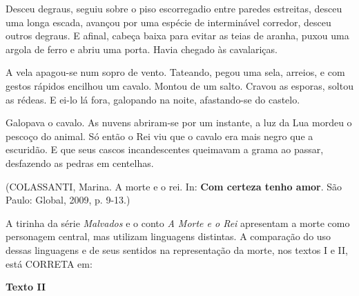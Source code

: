 Desceu degraus, seguiu sobre o piso escorregadio entre paredes estreitas, desceu uma longa escada, avançou por uma espécie de interminável corredor, desceu outros degraus. E afinal, cabeça baixa para evitar as teias de aranha, puxou uma argola de ferro e abriu uma porta. Havia chegado às cavalariças.

A vela apagou-se num sopro de vento. Tateando, pegou uma sela, arreios, e com gestos rápidos encilhou um cavalo. Montou de um salto. Cravou as esporas, soltou as rédeas. E ei-lo lá fora, galopando na noite, afastando-se do castelo.

Galopava o cavalo. As nuvens abriram-se por um instante, a luz da Lua mordeu o pescoço do animal. Só então o Rei viu que o cavalo era mais negro que a escuridão. E que seus cascos incandescentes queimavam a grama ao passar, desfazendo as pedras em centelhas.

\begin{flushright}(COLASSANTI, Marina. A morte e o rei. In: \textbf{Com certeza tenho amor}. São Paulo: Global, 2009, p. 9-13.)\end{flushright}

A tirinha da série \textit{Malvados} e o conto \textit{A Morte e o Rei} apresentam a morte como personagem central, mas utilizam linguagens distintas. A comparação do uso dessas linguagens e de seus sentidos na representação da morte, nos textos I e II, está CORRETA em:

\textbf{Texto II}


